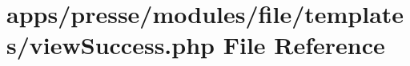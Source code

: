 \hypertarget{presse_2modules_2file_2templates_2view_success_8php}{\section{apps/presse/modules/file/templates/view\-Success.php File Reference}
\label{presse_2modules_2file_2templates_2view_success_8php}
}
